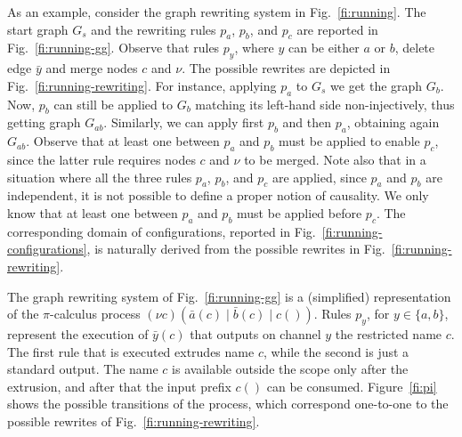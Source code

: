 As an example, consider the graph rewriting system in
Fig.~\ref{fi:running}.
%
The start graph $G_s$ and the rewriting rules $p_a$, $p_b$, and $p_c$
are reported in Fig.~\ref{fi:running-gg}.  Observe that rules $p_y$,
where $y$ can be either $a$ or $b$, delete edge $\bar{y}$ and merge
nodes $c$ and $\nu$. The possible rewrites are depicted in
Fig.~\ref{fi:running-rewriting}. For instance, applying $p_a$ to $G_s$
we get the graph $G_b$. Now, $p_b$ can still be applied to $G_b$
matching its left-hand side non-injectively, thus getting graph
$G_{ab}$. Similarly, we can apply first $p_b$ and then $p_a$,
obtaining again $G_{ab}$. Observe that at least one between $p_a$ 
and $p_b$ must be applied to enable $p_c$, since the latter rule requires 
nodes $c$ and $\nu$ to be merged.
%
{Note also} that in a situation where all the three rules $p_a$, $p_b$, and
$p_c$ are applied, since $p_a$ and $p_b$ are independent,
it is not possible to define a proper notion of causality. We only
know that at least one between $p_a$ and $p_b$ must be applied  
before $p_c$.
%
The corresponding domain of configurations, reported in
Fig.~\ref{fi:running-configurations}, is naturally derived from the
possible rewrites in Fig.~\ref{fi:running-rewriting}. 


The graph rewriting system of Fig.~\ref{fi:running-gg} is a (simplified) representation of the
$\pi$-calculus process $(\nu c)(\bar{a}(c) \mid \bar{b}(c) \mid
c())$. Rules $p_y$, for $y \in \{a,b\}$, represent the execution of
$\bar{y}(c)$ that outputs on channel $y$ the restricted name $c$. The
first rule that is executed extrudes name $c$, while the second is just a standard
output. The name $c$ is available outside the scope only after the extrusion, and 
after that the input prefix $c()$ can be consumed. {Figure~\ref{fi:pi} shows the possible transitions of the process, which correspond one-to-one to the possible rewrites of  Fig.~\ref{fi:running-rewriting}.}

